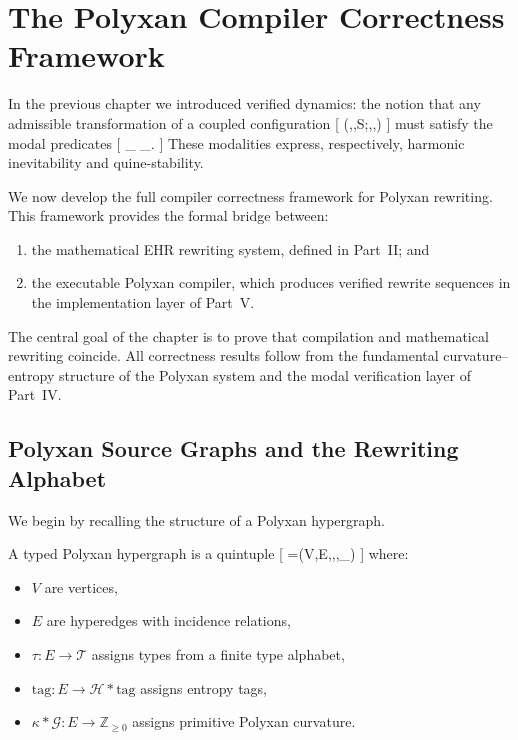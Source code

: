 \chapter{The Polyxan Compiler Correctness Framework}
\label{ch:38}

In the previous chapter we introduced verified dynamics: the notion that any admissible transformation of a coupled configuration
[
(\Phi,,S;,,\iota)
]
must satisfy the modal predicates
[
\Box_{} \qquad{}\qquad \Box_{}.
]
These modalities express, respectively, harmonic inevitability and quine-stability.

We now develop the full compiler correctness framework for Polyxan rewriting.
This framework provides the formal bridge between:

\begin{enumerate}
\item the mathematical EHR rewriting system, defined in Part~II; and
\item the executable Polyxan compiler, which produces verified rewrite sequences in the implementation layer of Part~V.
\end{enumerate}

The central goal of the chapter is to prove that compilation and mathematical rewriting coincide.
All correctness results follow from the fundamental curvature--entropy structure of the Polyxan system and the modal verification layer of Part~IV.

\section{Polyxan Source Graphs and the Rewriting Alphabet}

We begin by recalling the structure of a Polyxan hypergraph.

\begin{definition}
A typed Polyxan hypergraph is a quintuple
[
=(V,E,\tau,,\kappa_{})
]
where:
\begin{itemize}
\item $V$ are vertices,
\item $E$ are hyperedges with incidence relations,
\item $\tau : E\to \mathcal{T}$ assigns types from a finite type alphabet,
\item $\mathrm{tag} : E\to \mathcal{H}*{\mathrm{tag}}$ assigns entropy tags,
\item $\kappa*{\mathcal{G}} : E\to \mathbb{Z}_{\ge 0}$ assigns primitive Polyxan curvature.
\end{itemize}
\end{definition}

